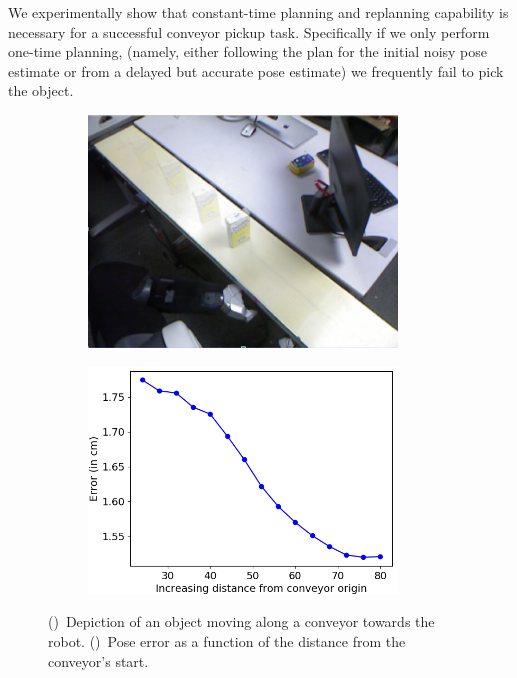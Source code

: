 \documentclass[conference]{IEEEtran}
\begin{document}
%
We experimentally show that constant-time planning and replanning capability is necessary for a successful conveyor pickup task. Specifically if we only perform one-time planning, (namely, either following the plan for the initial noisy pose estimate or from a delayed but accurate pose estimate) we frequently fail to pick the object.
\begin{figure}[t]
    \centering
    \begin{subfigure}{.225\textwidth}
        \includegraphics[width=0.9\textwidth]{object_blur}
        \caption{}
        \label{fig:obj1}
    \end{subfigure}
    \begin{subfigure}{0.225\textwidth}
        \includegraphics[width=0.9\textwidth]{pose_error_f}
        \caption{}
        \label{fig:obj2}
    \end{subfigure}
    \caption{
    \CaptionTextSize
    ()~Depiction of an object moving along a conveyor towards the robot.
    ()~Pose error as a function of the distance from the conveyor's start.
    }
    \label{fig:pose_sequence}
\end{figure}
\end{document}
